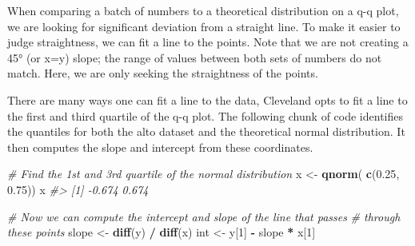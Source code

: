 \documentclass[]{book}
\newenvironment{Shaded}{\begin{snugshade}}{\end{snugshade}}
\newcommand{\CommentTok}[1]{\textcolor[rgb]{0.56,0.35,0.01}{\textit{#1}}}
\newcommand{\DataTypeTok}[1]{\textcolor[rgb]{0.13,0.29,0.53}{#1}}
\newcommand{\DecValTok}[1]{\textcolor[rgb]{0.00,0.00,0.81}{#1}}
\newcommand{\FloatTok}[1]{\textcolor[rgb]{0.00,0.00,0.81}{#1}}
\newcommand{\KeywordTok}[1]{\textcolor[rgb]{0.13,0.29,0.53}{\textbf{#1}}}
\newcommand{\NormalTok}[1]{#1}
\newcommand{\OperatorTok}[1]{\textcolor[rgb]{0.81,0.36,0.00}{\textbf{#1}}}
\newcommand{\StringTok}[1]{\textcolor[rgb]{0.31,0.60,0.02}{#1}}
\begin{document}
When comparing a batch of numbers to a theoretical distribution on a q-q plot, we are looking for significant deviation from a straight line. To make it easier to judge straightness, we can fit a line to the points. Note that we are not creating a 45° (or x=y) slope; the range of values between both sets of numbers do not match. Here, we are only seeking the straightness of the points.

There are many ways one can fit a line to the data, Cleveland opts to fit a line to the first and third quartile of the q-q plot. The following chunk of code identifies the quantiles for both the alto dataset and the theoretical normal distribution. It then computes the slope and intercept from these coordinates.

\begin{Shaded}
\end{Shaded}

\begin{Shaded}
\begin{Highlighting}[]
\CommentTok{# Find the 1st and 3rd quartile of the normal distribution}
\NormalTok{x <-}\StringTok{ }\KeywordTok{qnorm}\NormalTok{( }\KeywordTok{c}\NormalTok{(}\FloatTok{0.25}\NormalTok{, }\FloatTok{0.75}\NormalTok{))}
\NormalTok{x}
\CommentTok{#> [1] -0.674  0.674}
\end{Highlighting}
\end{Shaded}

\begin{Shaded}
\begin{Highlighting}[]
\CommentTok{# Now we can compute the intercept and slope of the line that passes}
\CommentTok{# through these points}
\NormalTok{slope <-}\StringTok{ }\KeywordTok{diff}\NormalTok{(y) }\OperatorTok{/}\StringTok{ }\KeywordTok{diff}\NormalTok{(x)}
\NormalTok{int   <-}\StringTok{ }\NormalTok{y[}\DecValTok{1}\NormalTok{] }\OperatorTok{-}\StringTok{ }\NormalTok{slope }\OperatorTok{*}\StringTok{ }\NormalTok{x[}\DecValTok{1}\NormalTok{]}
\end{Highlighting}
\end{Shaded}
\end{document}
